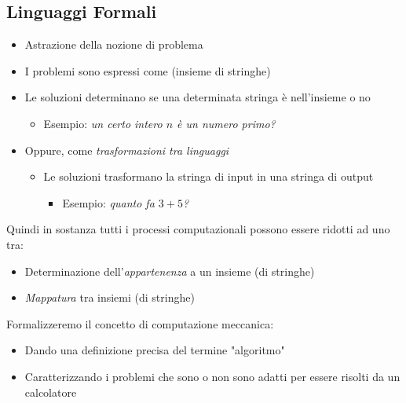 \subsection{Linguaggi Formali}
\begin{itemize}
	\item Astrazione della nozione di problema
	\item I problemi sono espressi come  (insieme di stringhe) 
	\item Le soluzioni determinano se una determinata stringa è nell'insieme o no
		\begin{itemize}
			\item  Esempio: \textit{un certo intero $n$ è un numero primo?}
		\end{itemize}
	\item  Oppure, come \textit{trasformazioni tra linguaggi}
		\begin{itemize}
			\item Le soluzioni trasformano la stringa di input in una stringa di output
				\begin{itemize}
					\item Esempio: \textit{quanto fa $3+5$?}
				\end{itemize}
		\end{itemize}
\end{itemize}
Quindi in sostanza tutti i processi computazionali possono essere ridotti ad uno tra:
\begin{itemize}
	\item Determinazione dell'\textit{appartenenza} a un insieme (di stringhe)
	\item \textit{Mappatura} tra insiemi (di stringhe)
\end{itemize}
Formalizzeremo il concetto di computazione meccanica:
\begin{itemize}
	\item Dando una definizione precisa del termine "algoritmo"
	\item Caratterizzando i problemi che sono o non sono adatti per essere risolti da un calcolatore
\end{itemize}
